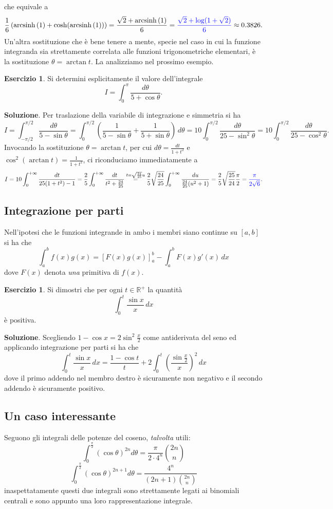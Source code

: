 \documentclass[a4paper,twoside]{article}
\newcommand{\R}{\mathbb{R}}
\newcommand{\arcsinh}[1]{\operatorname{arcsinh}\left(#1\right)}
\theoremstyle{definition}
\newtheorem{ex}[theorem]{Esercizio}
\numberwithin{theorem}{section}
\begin{document}
che equivale a 
$$ \frac{1}{6}\left(\arcsinh{1}+\cosh(\arcsinh{1})\right) = \frac{\sqrt{2}+\arcsinh{1}}{6}={\color{blue}\frac{\sqrt{2}+\log(1+\sqrt{2})}{6}}\approx 0.3826. $$
Un'altra sostituzione che è bene tenere a mente, specie nel caso in cui la funzione integranda sia strettamente correlata alle funzioni trigonometriche elementari, è la sostituzione $\theta=\arctan t$. La analizziamo nel prossimo esempio.
\begin{ex} Si determini esplicitamente il valore dell'integrale 
$$ I = \int_{0}^{\pi}\frac{d\theta}{5+\cos\theta}.$$
\end{ex}
\textbf{Soluzione}. Per traslazione della variabile di integrazione e simmetria si ha 
$$ I = \int_{-\pi/2}^{\pi/2}\frac{d\theta}{5-\sin\theta} = \int_{0}^{\pi/2}\left(\frac{1}{5-\sin\theta}+\frac{1}{5+\sin\theta}\right)\,d\theta = 10\int_{0}^{\pi/2}\frac{d\theta}{25-\sin^2\theta}=10\int_{0}^{\pi/2}\frac{d\theta}{25-\cos^2\theta}. $$
Invocando la sostituzione $\theta=\arctan t$, per cui $d\theta=\frac{dt}{1+t^2}$ e $\cos^2(\arctan t)=\frac{1}{1+t^2}$, ci riconduciamo immediatamente a
$$ I = 10\int_{0}^{+\infty}\frac{dt}{25(1+t^2)-1}=\frac{2}{5}\int_{0}^{+\infty}\frac{dt}{t^2+\frac{24}{25}}\stackrel{t=\sqrt{\frac{24}{25}}u}{=}\frac{2}{5}\sqrt{\frac{24}{25}}\int_{0}^{+\infty}\frac{du}{\frac{24}{25}(u^2+1)}=\frac{2}{5}\sqrt{\frac{25}{24}}\frac{\pi}{2} = {\color{blue}\frac{\pi}{2\sqrt{6}}}. $$


\subsection{Integrazione per parti}
Nell'ipotesi che le funzioni integrande in ambo i membri siano continue su $[a,b]$ si ha che 
$$ \int_{a}^{b} f(x)g(x) = \left[ F(x)g(x)\right]_{a}^{b}-\int_{a}^{b} F(x)g'(x)\,dx $$
dove $F(x)$ denota \emph{una} primitiva di $f(x)$.
\begin{ex} Si dimostri che per ogni $t\in\R^+$ la quantità 
$$ \int_{0}^{t}\frac{\sin x}{x}\,dx $$
è positiva. 
\end{ex}
\textbf{Soluzione}. Scegliendo $1-\cos x = 2\sin^2\frac{x}{2}$ come antiderivata del seno ed applicando integrazione per parti si ha che 
$$ \int_{0}^{t}\frac{\sin x}{x}\,dx = \frac{1-\cos t}{t}+2\int_{0}^{t}\left(\frac{\sin\frac{x}{2}}{x}\right)^2\,dx $$
dove il primo addendo nel membro destro è sicuramente non negativo e il secondo addendo è sicuramente positivo.

\subsection{Un caso interessante}
Seguono gli integrali delle potenze del coseno, \emph{talvolta} utili:
$$\int_{0}^{\frac{\pi}{2}}(\cos \theta)^{2n}d\theta=\frac{\pi}{2\cdot4^n}\binom{2n}{n}$$
$$\int_{0}^{\frac{\pi}{2}}(\cos \theta)^{2n+1}d\theta= \frac{4^n}{(2n+1)\binom{2n}{n}}$$
inaspettatamente questi due integrali sono strettamente legati ai binomiali centrali e sono appunto una loro rappresentazione integrale.
\end{document}
